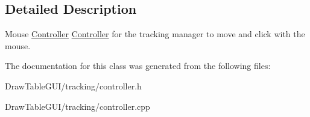 \subsection{Detailed Description}
Mouse \hyperlink{classController}{Controller} \hyperlink{classController}{Controller} for the tracking manager to move and click with the mouse. 

The documentation for this class was generated from the following files\+:\begin{DoxyCompactItemize}
\item 
Draw\+Table\+G\+U\+I/tracking/controller.\+h\item 
Draw\+Table\+G\+U\+I/tracking/controller.\+cpp\end{DoxyCompactItemize}
